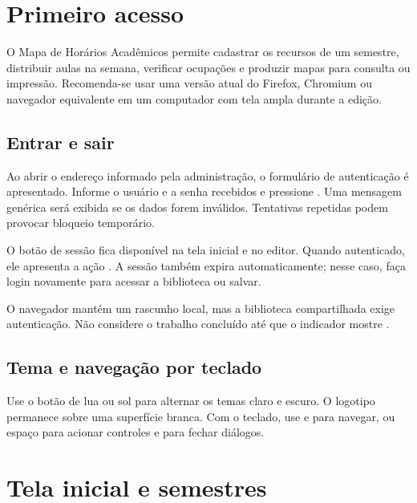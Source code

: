 \chapter{Primeiro acesso}

O Mapa de Horários Acadêmicos permite cadastrar os recursos de um semestre, distribuir aulas na semana, verificar ocupações e produzir mapas para consulta ou impressão. Recomenda-se usar uma versão atual do Firefox, Chromium ou navegador equivalente em um computador com tela ampla durante a edição.

\section{Entrar e sair}

Ao abrir o endereço informado pela administração, o formulário de autenticação é apresentado. Informe o usuário e a senha recebidos e pressione . Uma mensagem genérica será exibida se os dados forem inválidos. Tentativas repetidas podem provocar bloqueio temporário.


O botão de sessão fica disponível na tela inicial e no editor. Quando autenticado, ele apresenta a ação . A sessão também expira automaticamente; nesse caso, faça login novamente para acessar a biblioteca ou salvar.

\begin{noticebox}
O navegador mantém um rascunho local, mas a biblioteca compartilhada exige autenticação. Não considere o trabalho concluído até que o indicador mostre .
\end{noticebox}

\section{Tema e navegação por teclado}

Use o botão de lua ou sol para alternar os temas claro e escuro. O logotipo permanece sobre uma superfície branca. Com o teclado, use  e  para navegar,  ou espaço para acionar controles e  para fechar diálogos.

\chapter{Tela inicial e semestres}

